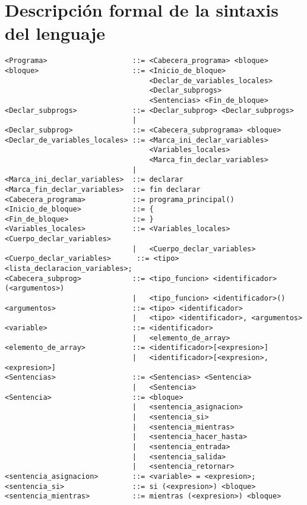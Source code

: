 \section{Descripción formal de la sintaxis del lenguaje}

\begin{verbatim}
<Programa>                    ::= <Cabecera_programa> <bloque>
<bloque>                      ::= <Inicio_de_bloque>
                                  <Declar_de_variables_locales>          
                                  <Declar_subprogs>
                                  <Sentencias> <Fin_de_bloque>
<Declar_subprogs>             ::= <Declar_subprog> <Declar_subprogs>
                              |
<Declar_subprog>              ::= <Cabecera_subprograma> <bloque>
<Declar_de_variables_locales> ::= <Marca_ini_declar_variables>
                                  <Variables_locales>
                                  <Marca_fin_declar_variables>
                              |
<Marca_ini_declar_variables>  ::= declarar
<Marca_fin_declar_variables>  ::= fin declarar
<Cabecera_programa>           ::= programa_principal()
<Inicio_de_bloque>            ::= {
<Fin_de_bloque>               ::= }
<Variables_locales>           ::= <Variables_locales> <Cuerpo_declar_variables>
                              |   <Cuerpo_declar_variables>
<Cuerpo_declar_variables>      ::= <tipo> <lista_declaracion_variables>;
<Cabecera_subprog>            ::= <tipo_funcion> <identificador>(<argumentos>)
                              |   <tipo_funcion> <identificador>()
<argumentos>                  ::= <tipo> <identificador>
                              |   <tipo> <identificador>, <argumentos>
<variable>                    ::= <identificador>
                              |   <elemento_de_array>
<elemento_de_array>           ::= <identificador>[<expresion>]
                              |   <identificador>[<expresion>, <expresion>]
<Sentencias>                  ::= <Sentencias> <Sentencia>
                              |   <Sentencia>
<Sentencia>                   ::= <bloque>
                              |   <sentencia_asignacion>
                              |   <sentencia_si>
                              |   <sentencia_mientras>
                              |   <sentencia_hacer_hasta>
                              |   <sentencia_entrada>
                              |   <sentencia_salida>
                              |   <sentencia_retornar>
<sentencia_asignacion>        ::= <variable> = <expresion>;
<sentencia_si>                ::= si (<expresion>) <bloque>
<sentencia_mientras>          ::= mientras (<expresion>) <bloque>

\end{verbatim}
